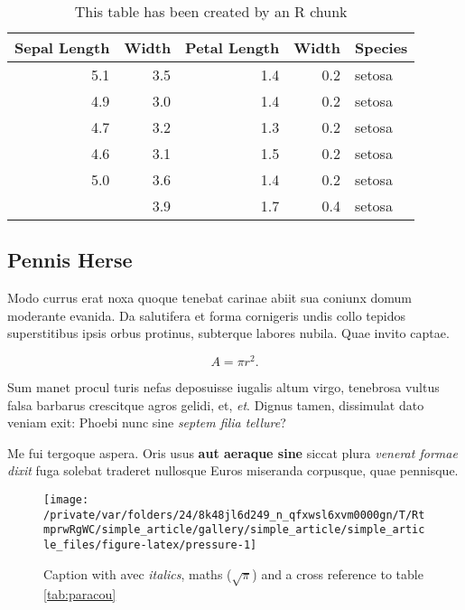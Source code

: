 \documentclass[fleqn,10pt]{article} %
\begin{document}
\scriptsize

\begin{longtable}[t]{rrrrl}
\caption{\label{tab:kable}This table has been created by an R chunk}\\
\toprule
Sepal Length & Width & Petal Length & Width & Species\\
\midrule
5.1 & 3.5 & 1.4 & 0.2 & setosa\\
4.9 & 3.0 & 1.4 & 0.2 & setosa\\
4.7 & 3.2 & 1.3 & 0.2 & setosa\\
4.6 & 3.1 & 1.5 & 0.2 & setosa\\
5.0 & 3.6 & 1.4 & 0.2 & setosa\\
\addlinespace
5.4 & 3.9 & 1.7 & 0.4 & setosa\\
\bottomrule
\end{longtable}

\normalsize

\hypertarget{pennis-herse}{%
\subsection{Pennis Herse}\label{pennis-herse}}

Modo currus erat noxa quoque tenebat carinae abiit sua coniunx domum moderante evanida.
Da salutifera et forma cornigeris undis collo tepidos superstitibus ipsis orbus protinus, subterque labores nubila.
Quae invito captae.

\begin{equation}
  A = \pi r^2.
  \label{eq:disc}
\end{equation}

Sum manet procul turis nefas deposuisse iugalis altum virgo, tenebrosa vultus falsa barbarus crescitque agros gelidi, et, \emph{et}.
Dignus tamen, dissimulat dato veniam exit: Phoebi nunc sine \emph{septem filia tellure}?

Me fui tergoque aspera.
Oris usus \textbf{aut aeraque sine} siccat plura \emph{venerat formae dixit} fuga solebat traderet nullosque Euros miseranda corpusque, quae pennisque.



\scriptsize

\begin{figure}

{\centering \texttt{[image: /private/var/folders/24/8k48jl6d249\_n\_qfxwsl6xvm0000gn/T/RtmprwRgWC/simple\_article/gallery/simple\_article/simple\_article\_files/figure-latex/pressure-1]} 

}

\caption{Caption with avec \emph{italics}, maths (\(\sqrt\pi\)) and a cross reference to table \ref{tab:paracou}}\label{fig:pressure}
\end{figure}
\end{document}
